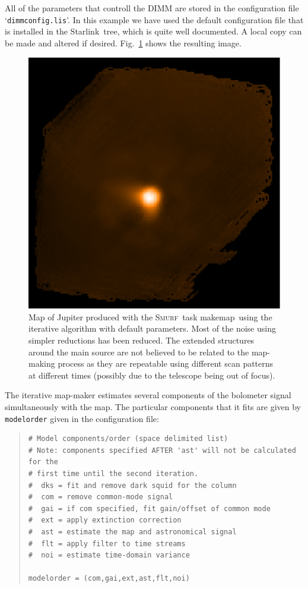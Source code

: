 \documentclass[twoside,11pt]{article}
\newenvironment{myquote}{\begin{quote}\begin{small}}{\end{small}\end{quote}}
\newcommand{\starlink}{\htmladdnormallink{Starlink}{http://star-www.rl.ac.uk/}}
\newcommand{\smurf}{\xref{\textsc{Smurf}}{sun258}{}}
\newcommand{\task}[1]{\textsf{#1}}
\newcommand{\makemap}{\xref{\task{makemap}}{sun258}{MAKEMAP}}
\newcommand{\htmladdnormallink}[2]{#1}
\newcommand{\xref}[3]{#1}
\renewcommand{\_}{\texttt{\symbol{95}}}
\begin{document}
All of the parameters that controll the DIMM are stored in the
configuration file `\texttt{dimmconfig.lis}'. In this example we have
used the default configuration file that is installed in the
\starlink\ tree, which is quite well documented. A local copy can be
made and altered if desired. Fig.~\ref{fig:itermap} shows the
resulting image.

\begin{figure}
\begin{center}
\includegraphics[width=0.5\linewidth]{map_iterate.eps}
\caption{Map of Jupiter produced with the \smurf\ task \makemap\ using
  the iterative algorithm with default parameters. Most of the noise
  using simpler reductions has been reduced. The extended structures
  around the main source are not believed to be related to the
  map-making process as they are repeatable using different scan
  patterns at different times (possibly due to the telescope being out
  of focus).}
\label{fig:itermap}
\end{center}
\end{figure}

The iterative map-maker estimates several components of the bolometer
signal simultaneously with the map. The particular components that it
fits are given by \texttt{modelorder} given in the configuration file:

\begin{myquote}
\begin{verbatim}
# Model components/order (space delimited list)
# Note: components specified AFTER 'ast' will not be calculated for the
# first time until the second iteration.
#  dks = fit and remove dark squid for the column
#  com = remove common-mode signal
#  gai = if com specified, fit gain/offset of common mode
#  ext = apply extinction correction
#  ast = estimate the map and astronomical signal
#  flt = apply filter to time streams
#  noi = estimate time-domain variance

modelorder = (com,gai,ext,ast,flt,noi)
\end{verbatim}
\end{myquote}
\end{document}
